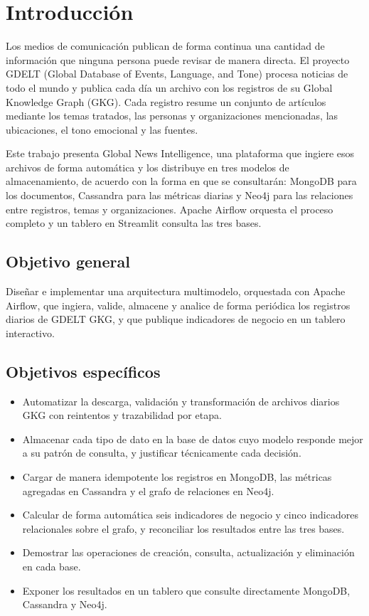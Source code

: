 \documentclass[11pt,a4paper]{article}
\begin{document}
\tableofcontents
\newpage

\section{Introducción}

Los medios de comunicación publican de forma continua una cantidad de información que ninguna persona puede revisar de manera directa. El proyecto GDELT (Global Database of Events, Language, and Tone) procesa noticias de todo el mundo y publica cada día un archivo con los registros de su Global Knowledge Graph (GKG). Cada registro resume un conjunto de artículos mediante los temas tratados, las personas y organizaciones mencionadas, las ubicaciones, el tono emocional y las fuentes.

Este trabajo presenta Global News Intelligence, una plataforma que ingiere esos archivos de forma automática y los distribuye en tres modelos de almacenamiento, de acuerdo con la forma en que se consultarán: MongoDB para los documentos, Cassandra para las métricas diarias y Neo4j para las relaciones entre registros, temas y organizaciones. Apache Airflow orquesta el proceso completo y un tablero en Streamlit consulta las tres bases.

\subsection{Objetivo general}

Diseñar e implementar una arquitectura multimodelo, orquestada con Apache Airflow, que ingiera, valide, almacene y analice de forma periódica los registros diarios de GDELT GKG, y que publique indicadores de negocio en un tablero interactivo.

\subsection{Objetivos específicos}

\begin{itemize}
    \item Automatizar la descarga, validación y transformación de archivos diarios GKG con reintentos y trazabilidad por etapa.
    \item Almacenar cada tipo de dato en la base de datos cuyo modelo responde mejor a su patrón de consulta, y justificar técnicamente cada decisión.
    \item Cargar de manera idempotente los registros en MongoDB, las métricas agregadas en Cassandra y el grafo de relaciones en Neo4j.
    \item Calcular de forma automática seis indicadores de negocio y cinco indicadores relacionales sobre el grafo, y reconciliar los resultados entre las tres bases.
    \item Demostrar las operaciones de creación, consulta, actualización y eliminación en cada base.
    \item Exponer los resultados en un tablero que consulte directamente MongoDB, Cassandra y Neo4j.
\end{itemize}
\end{document}

